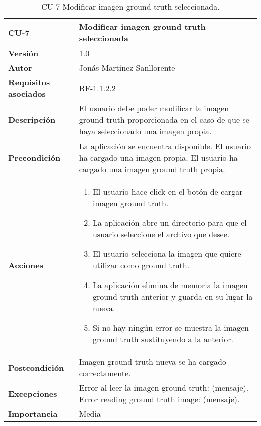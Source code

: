 \begin{table}[p]
	\centering
	\begin{tabularx}{\linewidth}{ p{} p{} }
		\toprule
		\textbf{CU-7}    & \textbf{Modificar imagen ground truth seleccionada}\\
		\toprule
		\textbf{Versión}              & 1.0    \\
		\textbf{Autor}                & Jonás Martínez Sanllorente \\
		\textbf{Requisitos asociados} & RF-1.1.2.2 \\
		\textbf{Descripción}          & El usuario debe poder modificar la imagen ground truth proporcionada en el caso de que se haya seleccionado una imagen propia. \\
		\textbf{Precondición}         & La aplicación se encuentra disponible.\newline
                                        El usuario ha cargado una imagen propia.\newline
                                        El usuario ha cargado una imagen ground truth propia.\\
		\textbf{Acciones}             &
		\begin{enumerate}
			\def\labelenumi{\arabic{enumi}.}
			\tightlist
			\item El usuario hace click en el botón de cargar imagen ground truth.
			\item La aplicación abre un directorio para que el usuario seleccione el archivo que desee.
            \item El usuario selecciona la imagen que quiere utilizar como ground truth.
            \item La aplicación elimina de memoria la imagen ground truth anterior y guarda en su lugar la nueva.
            \item Si no hay ningún error se muestra la imagen ground truth sustituyendo a la anterior.
		\end{enumerate}\\
		\textbf{Postcondición}        & Imagen ground truth nueva se ha cargado correctamente. \\
		\textbf{Excepciones}          & Error al leer la imagen ground truth: (mensaje).\newline
                                        Error reading ground truth image: (mensaje).\\
		\textbf{Importancia}          & Media \\
		\bottomrule
	\end{tabularx}
	\caption{CU-7 Modificar imagen ground truth seleccionada.}
\end{table}

